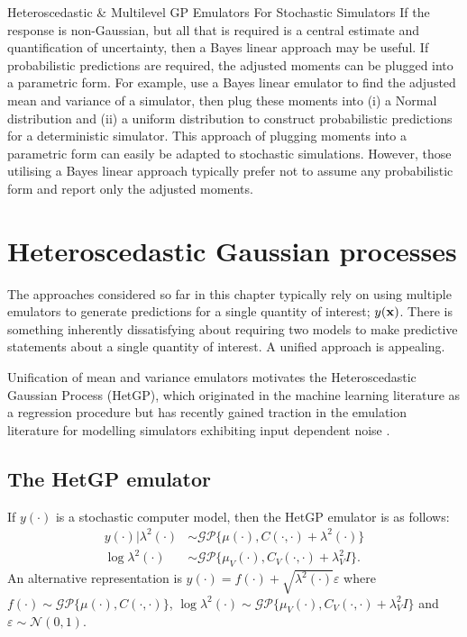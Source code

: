 \begin{chapter}{Heteroscedastic \& Multilevel GP Emulators For Stochastic Simulators\label{Ch:Hetsml}}
If the response is non-Gaussian, but all that is required is a central estimate and quantification of uncertainty, then a Bayes linear approach may be useful. If probabilistic predictions are required, the adjusted moments can be plugged into a parametric form. For example, \citet{Jackson2019} use a Bayes linear emulator to find the adjusted mean and variance of a simulator, then plug these moments into (i) a Normal distribution and (ii) a uniform distribution to construct probabilistic predictions for a deterministic simulator. This approach of plugging moments into a parametric form can easily be adapted to stochastic simulations. However, those utilising a Bayes linear approach typically prefer not to assume any probabilistic form and report only the adjusted moments.

\section{Heteroscedastic Gaussian processes}

The approaches considered so far in this chapter typically rely on using multiple emulators to generate predictions for a single quantity of interest; $y(\mathbf{x})$. There is something inherently dissatisfying about requiring two  models to make predictive statements about a single quantity of interest. A unified approach is appealing.

Unification of mean and variance emulators motivates the Heteroscedastic Gaussian Process (HetGP), which originated in the machine learning literature as a regression procedure \citep{Goldberg1998} but has recently gained traction in the emulation literature for modelling simulators exhibiting input dependent noise \citep{Binois2018, Baker2020c}.

\subsection{The HetGP emulator}

If $y(\cdot)$ is a stochastic computer model, then the HetGP emulator is as follows:
\begin{align}
y(\cdot) | \lambda^2(\cdot) &\sim \mathcal{GP} \{ \mu(\cdot), C(\cdot, \cdot) + \lambda^2(\cdot) \} \label{Eq:} \\
\log \lambda^2 (\cdot) &\sim \mathcal{GP} \{ \mu_V (\cdot), C_V (\cdot, \cdot) + \lambda_{V}^2 I \}.
\end{align}
An alternative representation is $y(\cdot) = f(\cdot) + \sqrt{\lambda^2(\cdot)} \varepsilon$ where $f(\cdot) \sim \mathcal{GP}\{ \mu(\cdot), C(\cdot, \cdot) \}$, $\log \lambda^2(\cdot) \sim \mathcal{GP}\{\mu_V(\cdot), C_V(\cdot, \cdot) + \lambda_V^2I \}$ and $\varepsilon \sim \mathcal{N}(0, 1)$.


\end{chapter}
